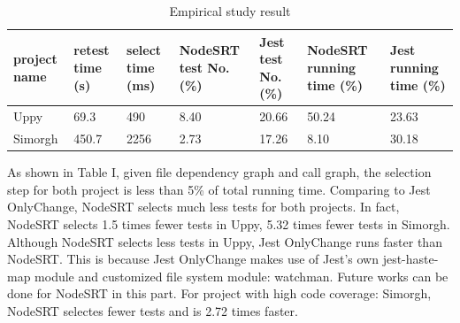 \documentclass[10pt, conference]{IEEEtran}
\begin{document}
\begin{table}[htbp]
    \caption{Empirical study result}
    \centering
    \begin{tabular}{@{}|p{3em}|p{2em}|p{1.8em}|p{3.5em}|p{2em}|p{3.5em}|p{2.5em}|@{}}
    \toprule
    project name & retest time (s)&select time (ms)&NodeSRT test No. (\%)&Jest test No. (\%)& NodeSRT running time (\%) & Jest running time (\%) \\ \midrule
    Uppy         & 69.3  &  490   &                    8.40              &  20.66              &   50.24               &   23.63                    \\ \midrule
    Simorgh      & 450.7  &  2256 &                    2.73              &  17.26              &   8.10                &   30.18                   \\ \bottomrule
    \end{tabular}
    \end{table}



As shown in Table I, given file dependency graph and call graph, the selection step for both project is less than 5\% of total 
running time. Comparing to Jest OnlyChange, NodeSRT selects much less tests for both projects. In fact, NodeSRT selects 1.5 times fewer 
tests in Uppy, 5.32 times fewer tests in Simorgh. Although NodeSRT selects less tests in Uppy, Jest OnlyChange runs faster than NodeSRT. 
This is because Jest OnlyChange makes use of Jest's own jest-haste-map module and customized file system module: watchman. Future works can 
be done for NodeSRT in this part. For project with high code coverage: Simorgh, NodeSRT selectes fewer tests and is 2.72 times faster. 
\end{document}
